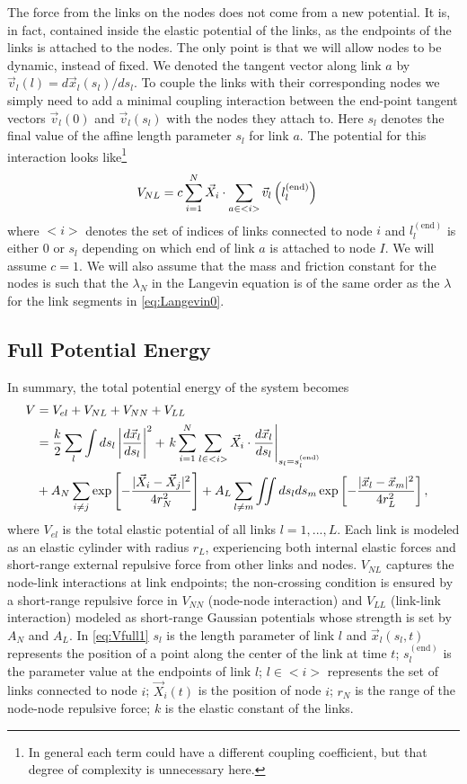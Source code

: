 \documentclass[linenumbers,endfloats,nofootinbib,preprint,floatfix,titlepage,superscriptaddress]{revtex4-1} %
\begin{document}
The force from the links on the nodes does  not come from a new potential. 
It is, in fact, contained inside the elastic potential of the links, %
as the endpoints of the links is attached to the nodes. The only point is that we will allow nodes to be dynamic, instead of fixed. We denoted the tangent vector along link $a$ by $\vec{v}_l(l) = d\vec{x}_l(s_l)/ds_l $. To couple the links with their corresponding nodes we simply need to add a minimal coupling interaction between the end-point tangent vectors $\vec{v}_l (0)$ and $\vec{v}_l (s_l)$ with the nodes they attach to. Here $s_l$ denotes the final value of the affine length parameter $s_l$ for link $a$. The potential for this interaction looks like\footnote{In general each term could have a different coupling coefficient, but that degree of complexity is unnecessary here.}
\begin{align}
   V_{NL} & =c\sum_{i=1}^N \vec{X}_i \cdot \sum_{a\in <i>}  \vec{v}_l\left(l^{(\mathrm{end})}_l\right)
\end{align}
where $<i>$ denotes the set of indices of links connected to node $i$ and $l^{(\mathrm{end})}_l$ is either $0$ or $s_l$ depending on which end of link $a$ is attached to node $I$. We will assume $c =1$. We will also assume that the mass and friction constant for the nodes is such that the $\lambda_N$ in the Langevin equation is of the same order as the $\lambda$ for the link segments in \eqref{eq:Langevin0}. 

\subsection{Full Potential Energy}
In summary, the total potential energy of the system becomes
\begin{align}
    V &= V_{el} + V_{NL} +V_{NN} + V_{LL} \cr 
    &= {k\over 2}\sum_l\int ds_l \left|{d\vec{x}_l\over ds_l} \right|^2 + 
    \left. k\sum_{i=1}^N  \sum_{l\in <i>}  \vec{X}_i \cdot{d\vec{x}_l%
    \over ds_l}\right|_{s_l = s_l^{(\mathrm{end})}}
    \cr
    &+ A_N\sum_{i\ne j}  \exp\left[- {|\vec{X}_i-\vec{X}_j|^2 \over 4r_N^2}\right]+A_L\sum_{l\ne m} \iint ds_lds_m 
    \exp\left[- {|\vec{x}_l-\vec{x}_m|^2 \over 4 r_L^2}\right] ,
 \label{eq:Vfull1}
\end{align}
where $V_{el}$ is the total elastic potential of all links $l=1,...,L$. 
Each link is modeled as an elastic cylinder with radius $r_L$, experiencing both internal elastic forces and short-range external repulsive force from other links and nodes. $V_{NL}$ captures the node-link interactions at link endpoints;
the non-crossing condition is ensured by a short-range repulsive force in
$V_{NN}$  (node-node interaction)  and  $V_{LL}$ (link-link interaction) modeled as short-range Gaussian potentials whose strength is set by $A_N$ and $A_L$. 
In \eqref{eq:Vfull1} $s_l$ is the length parameter of link $l$ and  $\vec{x}_l(s_l,t)$ represents the position of a point along the center of the link at time $t$;
$s_l^\mathrm{(end)}$ is the parameter value at the endpoints of link $l$;
$l\in <i>$ represents the set of links connected to node $i$; 
$\vec{X}_i(t)$ is the position of node $i$; $r_N$ is the range of the node-node repulsive force; $k$ is the elastic constant of the links.
\end{document}
